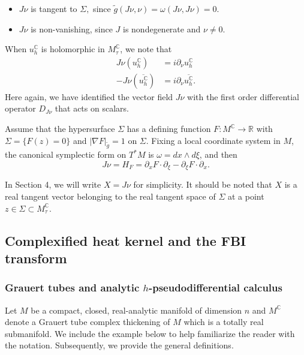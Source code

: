 \documentclass[11pt,reqno]{amsart}
\newcommand{\R}{{\mathbb R}}
\newcommand{\C}{{\mathbb C}}
\theoremstyle{definition}
\begin{document}
\begin{itemize}
    \item $J\nu$ is tangent to $\Sigma,$ since $\tilde{g}(J\nu,\nu)=\omega(J\nu,J\nu)=0$.
    \item $J\nu$ is non-vanishing, since $J$ is nondegenerate and $\nu\neq 0$.
\end{itemize}
When $u^{\mathbb{C}}_h$ is holomorphic in $M^{\C}_{\tau}$, we note that
\begin{equation}\label{CReqs}    
\begin{split}
J\nu(u^{\mathbb{C}}_h)&=i\partial_{\nu}u^{\mathbb{C}}_h\\
    -J\nu(\overline{u^{\mathbb{C}}_h})&=i\partial_{\nu}\overline{u^{\mathbb{C}}_h}.
\end{split}
\end{equation}
Here again, we have identified the vector field $J\nu$ with the first order differential operator $D_{J\nu}$ that acts on scalars.

Assume that the hypersurface $\Sigma$ has a defining function $F:M^{\C} \to \R$ with $\Sigma=\{F(z)=0\}$ and $|\nabla F|_{\tilde{g}}=1$ on $\Sigma$.
Fixing a local coordinate system in $M$, the canonical symplectic form on $T^*M$ is $\omega=dx\wedge d\xi$, and then
\begin{equation}\label{Jnu coords}
J\nu=H_{F}=\partial_xF\cdot \partial_{\xi}-\partial_{\xi}F\cdot \partial_x.
\end{equation}

In Section 4, we will write $X=J\nu$ for simplicity. It should be noted that $X$ is a real tangent vector belonging to the real tangent space of $\Sigma$ at a point $z\in \Sigma\subset M^{\mathbb{C}}_{\tau}$.


\subsection{Complexified heat kernel and the FBI transform}

\subsubsection{ Grauert tubes and analytic $h$-pseudodifferential calculus} Let $M$ be a compact, closed, real-analytic manifold of dimension $n$ and $M^{\C}$ denote a Grauert tube complex thickening of $M$ which is a totally real submanifold.  We include the example below to  help  familiarize the  reader with the notation. Subsequently, we provide the general definitions.
\end{document}
